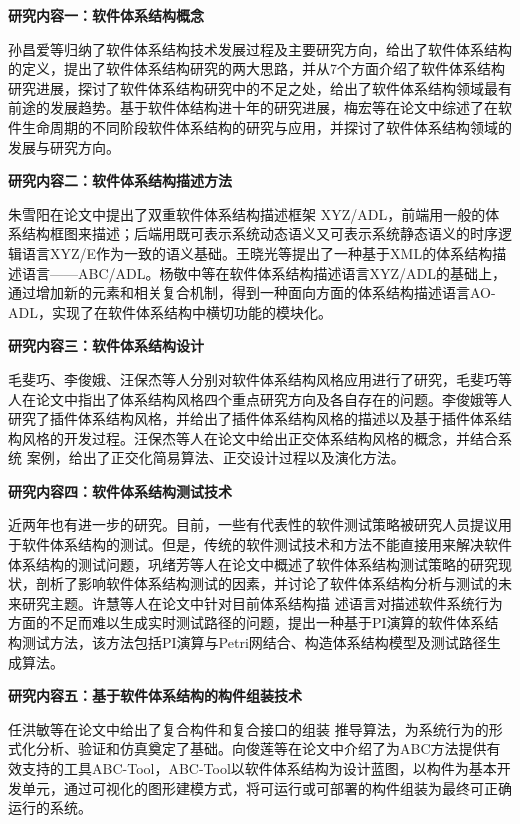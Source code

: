 \documentclass[article]{BJTU-thesis}
\begin{document}
	\noindent\textbf{研究内容一：软件体系结构概念}
	
	 孙昌爱等\cite{b}归纳了软件体系结构技术发展过程及主要研究方向，给出了软件体系结构的定义，提出了软件体系结构研究的两大思路，并从7个方面介绍了软件体系结构研究进展，探讨了软件体系结构研究中的不足之处，给出了软件体系结构领域最有前途的发展趋势。基于软件体结构进十年的研究进展，梅宏等在论文\cite{c}中综述了在软件生命周期的不同阶段软件体系结构的研究与应用，并探讨了软件体系结构领域的发展与研究方向。
	\newline
	
	\noindent\textbf{研究内容二：软件体系结构描述方法}
	
	朱雪阳在论文\cite{d}中提出了双重软件体系结构描述框架 XYZ/ADL，前端用一般的体系结构框图来描述；后端用既可表示系统动态语义又可表示系统静态语义的时序逻辑语言XYZ/E作为一致的语义基础。王晓光等\cite{e}提出了一种基于XML的体系结构描述语言——ABC/ADL。杨敬中等\cite{f}在软件体系结构描述语言XYZ/ADL的基础上，通过增加新的元素和相关复合机制，得到一种面向方面的体系结构描述语言AO-ADL，实现了在软件体系结构中横切功能的模块化。
	\newline
	
	\noindent\textbf{研究内容三：软件体系结构设计}
	
	毛斐巧、李俊娥、汪保杰等人分别对软件体系结构风格应用进行了研究，毛斐巧等人\cite{g}在论文中指出了体系结构风格四个重点研究方向及各自存在的问题。李俊娥等人\cite{h}研究了插件体系结构风格，并给出了插件体系结构风格的描述以及基于插件体系结构风格的开发过程。汪保杰等人\cite{i}在论文中给出正交体系结构风格的概念，并结合系统 案例，给出了正交化简易算法、正交设计过程以及演化方法。
	\newline
	
	\noindent\textbf{研究内容四：软件体系结构测试技术}
	
	近两年也有进一步的研究。目前，一些有代表性的软件测试策略被研究人员提议用于软件体系结构的测试。但是，传统的软件测试技术和方法不能直接用来解决软件体系结构的测试问题，巩绪芳等人在论文\cite{j}中概述了软件体系结构测试策略的研究现状，剖析了影响软件体系结构测试的因素，并讨论了软件体系结构分析与测试的未来研究主题。许慧等人在论文中\cite{k}针对目前体系结构描 述语言对描述软件系统行为方面的不足而难以生成实时测试路径的问题，提出一种基于PI演算的软件体系结构测试方法，该方法包括PI演算与Petri网结合、构造体系结构模型及测试路径生成算法。
	\newline
	
	\noindent\textbf{研究内容五：基于软件体系结构的构件组装技术}
	
	任洪敏等在论文\cite{l}中给出了复合构件和复合接口的组装 推导算法，为系统行为的形式化分析、验证和仿真奠定了基础。向俊莲等在论文\cite{m}中介绍了为ABC方法提供有效支持的工具ABC-Tool，ABC-Tool以软件体系结构为设计蓝图，以构件为基本开发单元，通过可视化的图形建模方式，将可运行或可部署的构件组装为最终可正确运行的系统。
	
\end{document}
